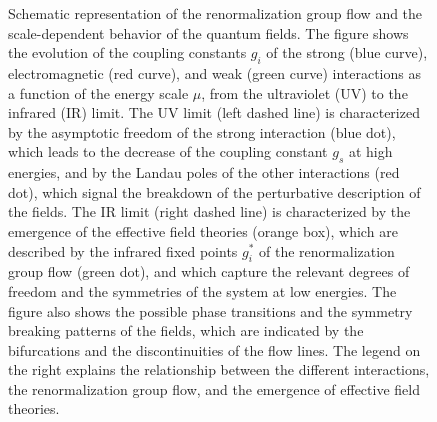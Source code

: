 \begin{figure}[h]
\caption{Schematic representation of the renormalization group flow and the scale-dependent behavior of the quantum fields. The figure shows the evolution of the coupling constants $g_i$ of the strong (blue curve), electromagnetic (red curve), and weak (green curve) interactions as a function of the energy scale $\mu$, from the ultraviolet (UV) to the infrared (IR) limit. The UV limit (left dashed line) is characterized by the asymptotic freedom of the strong interaction (blue dot), which leads to the decrease of the coupling constant $g_s$ at high energies, and by the Landau poles of the other interactions (red dot), which signal the breakdown of the perturbative description of the fields. The IR limit (right dashed line) is characterized by the emergence of the effective field theories (orange box), which are described by the infrared fixed points $g_i^*$ of the renormalization group flow (green dot), and which capture the relevant degrees of freedom and the symmetries of the system at low energies. The figure also shows the possible phase transitions and the symmetry breaking patterns of the fields, which are indicated by the bifurcations and the discontinuities of the flow lines. The legend on the right explains the relationship between the different interactions, the renormalization group flow, and the emergence of effective field theories.}
\label{fig:renormalization_group}
\end{figure}
